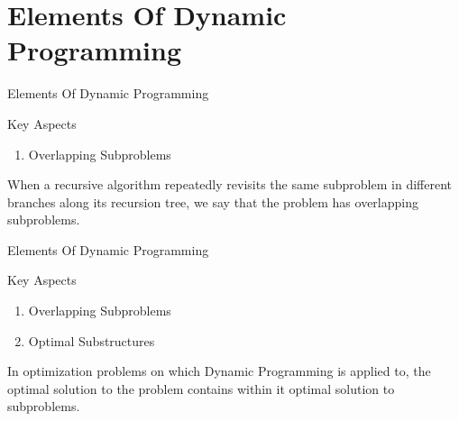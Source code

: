 \section{Elements Of Dynamic Programming}

\begin{frame}{Elements Of Dynamic Programming}
  \begin{block}{Key Aspects}
    \begin{enumerate}
      \item Overlapping Subproblems
    \end{enumerate}
    \pause
    When a recursive algorithm repeatedly revisits the same subproblem in different branches along its recursion
    tree, we say that the problem has overlapping subproblems.
  \end{block}
\end{frame}

\begin{frame}{Elements Of Dynamic Programming}
  \begin{block}{Key Aspects}
    \begin{enumerate}
      \item Overlapping Subproblems
      \item Optimal Substructures
    \end{enumerate}
    \pause
    In optimization problems on which Dynamic Programming is applied to, the optimal solution to the problem contains 
    within it optimal solution to subproblems.\cite{cormen2009introduction}
  \end{block}
\end{frame}